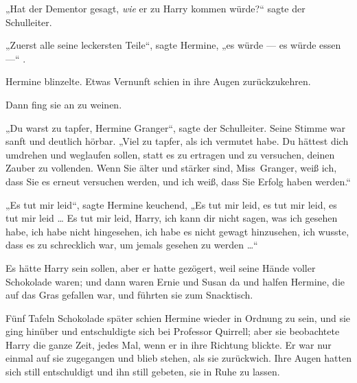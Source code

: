 „Hat der Dementor gesagt, \emph{wie} er zu Harry kommen würde?“ sagte der Schulleiter.

„Zuerst alle seine leckersten Teile“, sagte Hermine, „es würde — es würde essen —“ .

Hermine blinzelte. Etwas Vernunft schien in ihre Augen zurückzukehren.

Dann fing sie an zu weinen.

„Du warst zu tapfer, Hermine Granger“, sagte der Schulleiter. Seine Stimme war sanft und deutlich hörbar.
„Viel zu tapfer, als ich vermutet habe. Du hättest dich umdrehen und weglaufen sollen, statt es zu ertragen und zu versuchen, deinen Zauber zu vollenden. Wenn Sie älter und stärker sind, Miss~Granger, weiß ich, dass Sie es erneut versuchen werden, und ich weiß, dass Sie Erfolg haben werden.“

„Es tut mir leid“, sagte Hermine keuchend,
„Es tut mir leid, es tut mir leid, es tut mir leid … Es tut mir leid, Harry, ich kann dir nicht sagen, was ich gesehen habe, ich habe nicht hingesehen, ich habe es nicht gewagt hinzusehen, ich wusste, dass es zu schrecklich war, um jemals gesehen zu werden …“

Es hätte Harry sein sollen, aber er hatte gezögert, weil seine Hände voller Schokolade waren; und dann waren Ernie und Susan da und halfen Hermine, die auf das Gras gefallen war, und führten sie zum Snacktisch.

Fünf Tafeln Schokolade später schien Hermine wieder in Ordnung zu sein, und sie ging hinüber und entschuldigte sich bei Professor Quirrell; aber sie beobachtete Harry die ganze Zeit, jedes Mal, wenn er in ihre Richtung blickte. Er war nur einmal auf sie zugegangen und blieb stehen, als sie zurückwich. Ihre Augen hatten sich still entschuldigt und ihn still gebeten, sie in Ruhe zu lassen.

